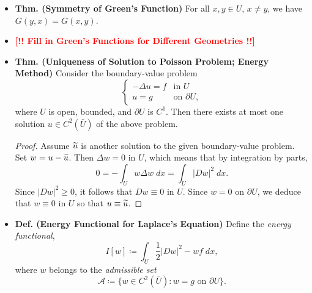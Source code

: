 \documentclass{article}
\begin{document}
\begin{itemize}
\begin{proof}
			\begin{equation*}
				u(x) = -\int_{\partial U}u(y)\frac{\partial G}{\partial \nu}(x,y)\;dS(y) - \int_{U}G(x,y)\Delta u(y)\;dy \qquad (x \in U), 
			\end{equation*}
			where $\partial G/\partial \nu(x,y) = D_{y}G(x,y) \cdot \boldsymbol{\nu}(y)$ is the outer normal derivative of $G$ with respect to the variable $y$. Since $\partial u/\partial \nu$ does not appear in this fixed equation, the corrector function $\phi^{x}$ was chosen correctly. Suppose now that $u \in C^{2}(\bar{U})$ satisfies the above boundary-value problem. Then making the necessary substitutions, one obtains the representation formula given above. 
		\end{proof}
		
		\item \textbf{Thm. (Symmetry of Green's Function)} For all $x,y\in U$, $x \neq y$, we have $G(y,x) = G(x,y)$. 
		
		\item \textbf{\textcolor{red}{[!! Fill in Green's Functions for Different Geometries !!]}}
		
		\item \textbf{Thm. (Uniqueness of Solution to Poisson Problem; Energy Method)} Consider the boundary-value problem 
		\begin{equation*}
			\begin{cases}
				-\Delta u = f & \text{in $U$} \\
				u = g & \text{on $\partial U$}, 
			\end{cases}
		\end{equation*}
		where $U$ is open, bounded, and $\partial U$ is $C^{1}$. Then there exists at most one solution $u \in C^{2}(\bar{U})$ of the above problem. 
		
		\begin{proof}
			Assume $\widetilde{u}$ is another solution to the given boundary-value problem. Set $w = u - \widetilde{u}$. Then $\Delta w = 0$ in $U$, which means that by integration by parts, 
			\begin{equation*}
				0 = -\int_{U}w\Delta w\;dx = \int_{U}|Dw|^{2}\;dx. 
			\end{equation*}
			Since $|Dw|^{2} \geq 0$, it follows that $Dw \equiv 0$ in $U$. Since $w = 0$ on $\partial U$, we deduce that $w \equiv 0$ in $U$ so that $u \equiv \widetilde{u}$. 
		\end{proof}
		
		\item \textbf{Def. (Energy Functional for Laplace's Equation)} Define the \textit{energy functional}, 
		\begin{equation*}
			I[w] \coloneqq \int_{U}\frac{1}{2}|Dw|^{2} - wf\;dx, 
		\end{equation*}
		where $w$ belongs to the \textit{admissible set}
		\begin{equation*}
			\mathcal{A} \coloneqq \{w\in C^{2}(\bar{U}): w = g \text{ on $\partial U$}\}. 
		\end{equation*}
		

\end{itemize}
\end{document}

